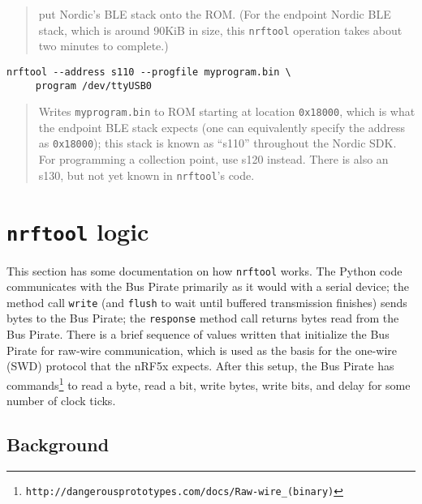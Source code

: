 \documentclass{article}
\begin{document}
\begin{trivlist}
\begin{quote}
put Nordic's BLE stack onto the ROM. (For the endpoint Nordic BLE stack, which is around 90KiB
in size, this \texttt{nrftool} operation takes about two minutes to complete.)
\end{quote}
\item \begin{verbatim}
nrftool --address s110 --progfile myprogram.bin \
     program /dev/ttyUSB0
\end{verbatim}
\begin{quote}
Writes \texttt{myprogram.bin} to ROM starting at location \texttt{0x18000}, which is what
the endpoint BLE stack expects (one can equivalently specify the address as \texttt{0x18000}); 
this stack is known as ``s110'' throughout the Nordic SDK. For programming a collection point,
use s120 instead. There is also an s130, but not yet known in \texttt{nrftool}'s code. 
\end{quote}
\end{trivlist}

\section*{\texttt{nrftool} logic}

This section has some documentation on how \texttt{nrftool} works. The Python code communicates
with the Bus Pirate primarily as it would with a serial device; the method call \texttt{write} 
(and \texttt{flush} to wait until buffered transmission finishes) sends bytes to the Bus Pirate; 
the \texttt{response} method call returns bytes read from the Bus Pirate. There is a brief
sequence of values written that initialize the Bus Pirate for raw-wire communication, which is
used as the basis for the one-wire (SWD) protocol that the nRF5x expects. After this setup, 
the Bus Pirate has commands\footnote{{\texttt{http://dangerousprototypes.com/docs/Raw-wire\_(binary)}}}
to read a byte, read a bit, write bytes, write bits, and delay for 
some number of clock ticks.

\subsection*{Background}
\end{document}
